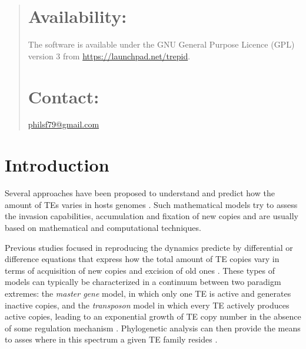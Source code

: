\documentclass{bioinfo}
\begin{document}
\begin{abstract}
\section{Availability:}
The software is available under the GNU General Purpose Licence (GPL) version 3 from
\url{https://launchpad.net/trepid}.


\section{Contact:} 
\href{philsf79@gmail.com}{philsf79@gmail.com}
\end{abstract}

\section{Introduction} 

Several approaches have been proposed to understand and predict how
the amount of TEs varies in hosts genomes
\citep{rouzic2005,HCX+05,SKR05}. Such mathematical models try to
assess the invasion capabilities, accumulation and fixation of new
copies and are usually based on mathematical and computational
techniques.

Previous %
studies focused in reproducing
the dynamics predicte by differential or difference equations that
express how the total amount of TE copies vary in terms of acquisition
of new copies and excision of old ones
\citep{QA97,QA98,DCB05,DLC+06}.%
These types of models can typically be characterized in a continuum
between two paradigm extremes: the \emph{master gene} model, in which
only one TE is active and generates inactive copies, and the
\emph{transposon} model in which every TE actively produces active
copies, leading to an exponential growth of TE copy number in the
absence of some regulation mechanism \citep{KRP05}. Phylogenetic
analysis can then provide the means to asses where in this spectrum a
given TE family resides \citep{BJ06,JB06}.
\end{document}

